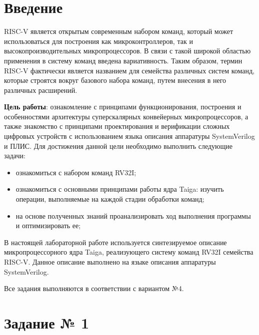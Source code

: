 \documentclass[12pt]{report}
\begin{document}
\setcounter{page}{2}
\tableofcontents

\newpage
\chapter*{Введение}
RISC-V является открытым современным набором команд, который может использоваться для построения как микроконтроллеров, так и высокопроизводительных микропроцессоров. В связи с такой широкой областью применения в систему команд введена вариативность. Таким образом, термин RISC-V фактически является названием для семейства различных систем команд, которые строятся вокруг базового набора команд, путем внесения в него различных расширений.

\textbf{Цель работы}: ознакомление с принципами функционирования, построения и особенностями архитектуры суперскалярных конвейерных микропроцессоров, а также знакомство с принципами проектирования и верификации сложных цифровых устройств с использованием языка описания аппаратуры SystemVerilog и ПЛИС.
Для достижения данной цели необходимо выполнить следующие задачи:
\begin{itemize}
    \item ознакомиться с набором команд RV32I;
    \item ознакомиться с основными принципами работы ядра Taiga: изучить операции, выполняемые на каждой стадии обработки команд;
    \item на основе полученных знаний проанализировать ход выполнения программы и оптимизировать ее; 
\end{itemize}

В настоящей лабораторной работе используется синтезируемое описание микропроцессорного ядра Taiga, реализующего систему команд RV32I семейства RISC-V. Данное описание выполнено на языке описания аппаратуры SystemVerilog.

Все задания выполняются в соответствии с вариантом №4.

\chapter{Задание № 1}
\end{document}
